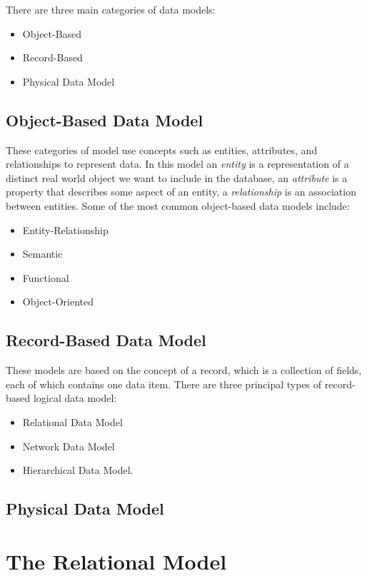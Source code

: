 \documentclass[12pt letter]{report}
\begin{document}
There are three main categories of data models:
\begin{itemize}
  \item Object-Based
  \item Record-Based
  \item Physical Data Model
\end{itemize}

\subsection{Object-Based Data Model}

These categories of model use concepts such as entities, attributes, and relationships to represent data. In this model an
\textit{entity} is a representation of a distinct real world object we want to include in the database, an
\textit{attribute} is a property that describes some aspect of an entity, a \textit{relationship} is an association
between entities. Some of the most common object-based data models include:
\begin{itemize}
  \item Entity-Relationship
  \item Semantic
  \item Functional
  \item Object-Oriented
\end{itemize}

\subsection{Record-Based Data Model}

These models are based on the concept of a record, which is a collection of fields, each of which contains one data
item. There are three principal types of record-based logical data model:
\begin{itemize}
  \item Relational Data Model
  \item Network Data Model
  \item Hierarchical Data Model.
\end{itemize}

\subsection{Physical Data Model}


\section{The Relational Model}
\end{document}
